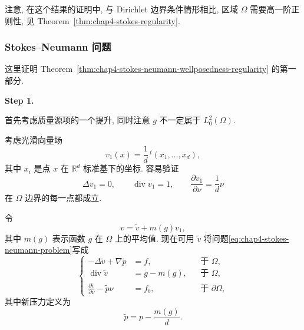 注意, 在这个结果的证明中, 与 Dirichlet 边界条件情形相比, 区域 $\Omega$ 需要高一阶正则性, 见 Theorem~\ref{thm:chap4-stokes-regularity}.

\subsubsection{Stokes--Neumann 问题}
\label{subsec:chap4-stokes-neumann}

这里证明 Theorem~\ref{thm:chap4-stokes-neumann-wellposedness-regularity} 的第一部分.

\begin{Proof}

\textbf{Step 1.}

首先考虑质量源项的一个提升, 同时注意 $g$ 不一定属于 $L_0^2(\Omega)$.

考虑光滑向量场
\[
 v_1(x)=\frac1d\,{}^t(x_1,\ldots,x_d),
\]
其中 $x_i$ 是点 $x$ 在 $\mathbb R^d$ 标准基下的坐标. 容易验证
\[
 \Delta v_1=0,\qquad\operatorname{div}v_1=1,
 \qquad\frac{\partial v_1}{\partial\nu}=\frac1d\nu
\]
在 $\Omega$ 边界的每一点都成立.

令
\[
 v=\widetilde v+m(g)v_1,
\]
其中 $m(g)$ 表示函数 $g$ 在 $\Omega$ 上的平均值. 现在可用 $\widetilde v$ 将问题\eqref{eq:chap4-stokes-neumann-problem}写成
\begin{equation}
 \left\{
 \begin{aligned}
  -\Delta\widetilde v+\nabla\widetilde p&=f,&&\text{于 }\Omega,\\
  \operatorname{div}\widetilde v&=g-m(g),&&\text{于 }\Omega,\\
  \frac{\partial\widetilde v}{\partial\nu}-\widetilde p\nu&=f_b,&&\text{于 }\partial\Omega,
 \end{aligned}
 \right.
 \label{eq:chap4-stokes-neumann-zero-mean-reduction}
\end{equation}
其中新压力定义为
\[
 \widetilde p=p-\frac{m(g)}d.
\]


\end{Proof}

